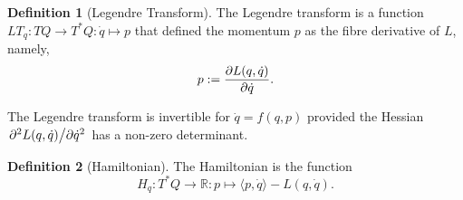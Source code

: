 \documentclass[]{article}
\theoremstyle{definition}
\theoremstyle{definition}
\newtheorem{definition}{Definition}[section]
\begin{document}
\begin{definition}[Legendre Transform]
  The Legendre transform is a function \(LT_q : TQ \to T^*Q : \dot q \mapsto p\)
  that defined the momentum \(p\) as the fibre derivative of \(L\), namely, 
  \[p := \pdv{L(q, \dot q)}{\dot q}.\]
\end{definition}

The Legendre transform is invertible for \(\dot q = f(q, p)\) provided the 
Hessian \(\pdv*[2]{L(q, \dot q)}{\dot q}\) has a non-zero determinant.

\begin{definition}[Hamiltonian]
  The Hamiltonian is the function 
  \[H_q : T^* Q \to \mathbb{R} : p \mapsto \langle p, \dot q \rangle - L(q, \dot q).\]
\end{definition}
\end{document}
